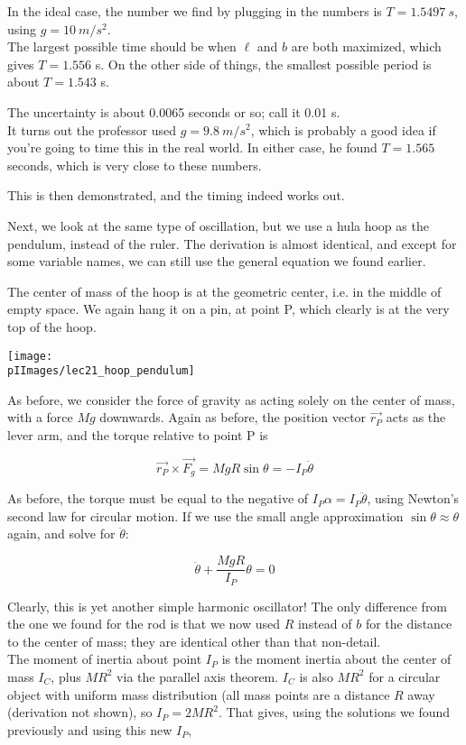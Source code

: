 In the ideal case, the number we find by plugging in the numbers is $T = \SI{1.5497}{s}$, using $g = \SI{10}{m/s^2}$.\\
The largest possible time should be when $\ell$ and $b$ are both maximized, which gives $T = 1.556$ s. On the other side of things, the smallest possible period is about $T = 1.543$ s.

The uncertainty is about 0.0065 seconds or so; call it 0.01 s.\\
It turns out the professor used $g = \SI{9.8}{m/s^2}$, which is probably a good idea if you're going to time this in the real world. In either case, he found $T = 1.565$ seconds, which is very close to these numbers.

This is then demonstrated, and the timing indeed works out.

Next, we look at the same type of oscillation, but we use a hula hoop as the pendulum, instead of the ruler. The derivation is almost identical, and except for some variable names, we can still use the general equation we found earlier.

The center of mass of the hoop is at the geometric center, i.e. in the middle of empty space. We again hang it on a pin, at point P, which clearly is at the very top of the hoop.

\begin{center}
\texttt{[image: \\pIImages/lec21\_hoop\_pendulum]}
\end{center}

As before, we consider the force of gravity as acting solely on the center of mass, with a force $M g$ downwards. Again as before, the position vector $\vec{r_P}$ acts as the lever arm, and the torque relative to point P is

\begin{equation}
\vec{r_P} \times \vec{F_g} = M g R \sin \theta = -I_P \ddot{\theta}
\end{equation}

As before, the torque must be equal to the negative of $I_P \alpha = I_P \ddot{\theta}$, using Newton's second law for circular motion. If we use the small angle approximation $\sin \theta \approx \theta$ again, and solve for $\ddot{\theta}$:

\begin{equation}
\ddot{\theta} + \frac{M g R}{I_P} \theta = 0
\end{equation}

Clearly, this is yet another simple harmonic oscillator! The only difference from the one we found for the rod is that we now used $R$ instead of $b$ for the distance to the center of mass; they are identical other than that non-detail.\\
The moment of inertia about point $I_P$ is the moment inertia about the center of mass $I_C$, plus $M R^2$ via the parallel axis theorem. $I_C$ is also $M R^2$ for a circular object with uniform mass distribution (all mass points are a distance $R$ away (derivation not shown), so $I_P = 2 M R^2$. That gives, using the solutions we found previously and using this new $I_P$,


